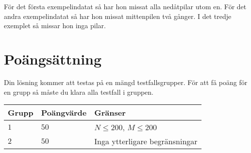 För det första exempelindatat så har hon missat alla nedåtpilar utom
en. För det andra exempelindatat så har hon missat mittenpilen två
gånger. I det tredje exemplet så missar hon inga pilar.

\section*{Poängsättning}
Din lösning kommer att testas på en mängd testfallsgrupper.
För att få poäng för en grupp så måste du klara alla testfall i gruppen.

\noindent
\begin{tabular}{| l | l | l |}
  \hline
  Grupp & Poängvärde & Gränser \\ \hline
  $1$   & $50$       & $N \leq 200$, $M \leq 200$ \\ \hline
  $2$   & $50$       & Inga ytterligare begränsningar \\ \hline
\end{tabular}
